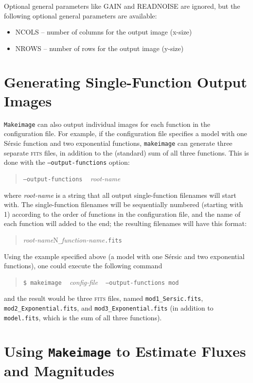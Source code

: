 \documentclass[10pt,a4paper,article]{memoir}
\newcommand{\makeimage}{\texttt{makeimage}}
\newcommand{\Makeimage}{\texttt{Makeimage}}
\begin{document}
Optional general parameters like GAIN and READNOISE are ignored, but the
following optional general parameters are available:

\begin{itemize}
\item NCOLS -- number of columns for the output image (x-size)

\item NROWS -- number of rows for the output image (y-size)

\end{itemize}




\section{Generating Single-Function Output Images}

\Makeimage{} can also output individual images for each function
in the configuration file. For example, if the configuration file specifies
a model with one S\'ersic function and two exponential functions, \makeimage{}
can generate three separate \textsc{fits} files, in addition to the (standard) sum of
all three functions.  This is done with the \texttt{--output-functions} option:
\begin{quote}
  \texttt{--output-functions} ~ \textit{root-name}
\end{quote}
where \textit{root-name} is a string that all output single-function filenames will
start with. The single-function filenames will be sequentially numbered (starting
with 1) according to the order of functions in the configuration file, and the
name of each function will added to the end; the resulting filenames will have
this format:
\begin{quote}
  \textit{root-name}{N}\texttt{\_}\textit{function-name}\texttt{.fits}
\end{quote}

Using the example specified above (a model with one S\'ersic and two exponential
functions), one could execute the following command
\begin{quote}
  \texttt{\$ \makeimage} ~ \textit{config-file} ~ \texttt{--output-functions mod}
\end{quote}
and the result would be three \textsc{fits} files, named \texttt{mod1\_Sersic.fits},
\texttt{mod2\_Exponential.fits}, and \texttt{mod3\_Exponential.fits} (in addition
to \texttt{model.fits}, which is the sum of all three functions).


\section{Using \Makeimage{} to Estimate Fluxes and Magnitudes}
\end{document}
